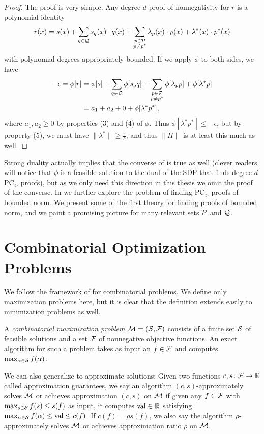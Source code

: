 \begin{proof}
The proof is very simple. Any degree $d$ proof of nonnegativity for $r$ is a polynomial identity
\[r(x) = s(x) + \sum_{q \in \mathcal Q} s_q(x)\cdot q(x) + \sum_{\substack{p \in \mathcal P \\ p \neq p^*}} \lambda_p(x) \cdot p(x) + \lambda^*(x) \cdot p^*(x)\]
with polynomial degrees appropriately bounded. If we apply $\phi$ to both sides, we have 
\begin{align*}
-\epsilon = \phi[r] &= \phi[s] + \sum_{q \in \mathcal Q} \phi[s_qq] + \sum_{\substack{p \in \mathcal P \\ p \neq p^*}} \phi[\lambda_p p] + \phi[\lambda^*p] \\
&= a_1 + a_2 + 0 + \phi[\lambda^* p^*],
\end{align*}
where $a_1,a_2 \geq 0$ by properties (3) and (4) of $\phi$. Thus $\phi[\lambda^* p^*] \leq -\epsilon$, but by property (5), we must have $\|\lambda^*\| \geq \frac{\epsilon}{\delta}$, and thus $\|\Pi\|$ is at least this much as well.
\end{proof}
Strong duality actually implies that the converse of  is true as well (clever readers will notice that $\phi$ is a feasible solution to the dual of the SDP that finds degree $d$ PC$_>$ proofs), but as we only need this direction in this thesis we omit the proof of the converse. In
 we further explore the problem of finding PC$_>$ proofs of bounded norm. We present some of the first theory for finding proofs of bounded norm, and we paint a promising picture for many relevant sets $\mathcal P$ and $\mathcal Q$.

\section{Combinatorial Optimization Problems}\label{sec:prelims_comb_opt}
We follow the framework of \cite{BPZ15} for combinatorial problems.
We define only maximization problems here, but it is clear that the definition extends easily to minimization problems as well.
\begin{definition}
A \emph{combinatorial maximization problem} \(\mathcal M = (\mathcal S, \mathcal F)\)
consists of a finite set
\(\mathcal S\) of feasible solutions and a set \(\mathcal F\) of nonnegative
objective functions. An exact algorithm for such a problem takes as input an $f \in \mathcal F$ and computes
$\max_{\alpha \in \mathcal S} f(\alpha)$.

We can also generalize to approximate solutions: Given two functions \(c,s \colon \mathcal F \rightarrow \mathbb R\)
called approximation guarantees, we say
an algorithm \((c,s)\)-approximately solves \(\mathcal M\) or achieves approximation $(c,s)$ on $\mathcal M$
if given any \(f \in \mathcal F\) with \(\max_{s \in \mathcal S} f(s) \leq s(f)\) as input,
it computes \(\operatorname{val} \in \mathbb R\) satisfying
\(\max_{\alpha \in \mathcal S} f(\alpha) \leq \operatorname{val} \leq c(f)\).
If $c(f) = \rho s(f)$, we also say the algorithm $\rho$-approximately solves $\mathcal M$ or achieves approximation ratio $\rho$ on $\mathcal M$. 
\end{definition}

